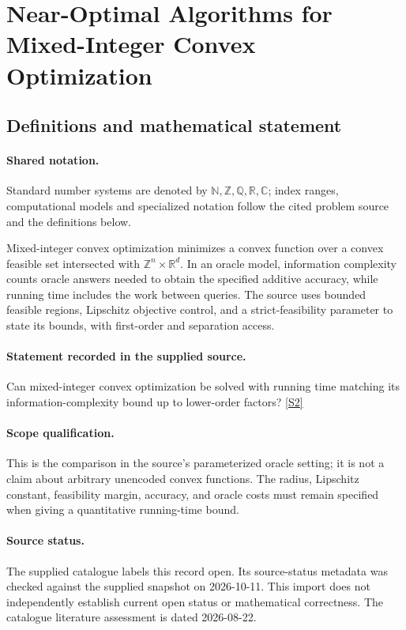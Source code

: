 \documentclass[11pt]{article}
\newcommand{\sref}[2]{\hyperlink{source:#1:#2}{[S#2]}}
\begin{document}
\section{Near-Optimal Algorithms for Mixed-Integer Convex Optimization}\label{statement}

\subsection{Definitions and mathematical statement}

\paragraph{Shared notation.}Standard number systems are denoted by $\mathbb N,\mathbb Z,\mathbb Q,\mathbb R,\mathbb C$; index ranges, computational models and specialized notation follow the cited problem source and the definitions below.


Mixed-integer convex optimization minimizes a convex function over a convex feasible set intersected with $\mathbb Z^n\times\mathbb R^d$. In an oracle model, information complexity counts oracle answers needed to obtain the specified additive accuracy, while running time includes the work between queries. The source uses bounded feasible regions, Lipschitz objective control, and a strict-feasibility parameter to state its bounds, with first-order and separation access.
\paragraph{Statement recorded in the supplied source.}
Can mixed-integer convex optimization be solved with running time matching its information-complexity bound up to lower-order factors? \sref{statement}{2}
\paragraph{Scope qualification.}
This is the comparison in the source's parameterized oracle setting; it is not a claim about arbitrary unencoded convex functions. The radius, Lipschitz constant, feasibility margin, accuracy, and oracle costs must remain specified when giving a quantitative running-time bound.
\paragraph{Source status.}
The supplied catalogue labels this record open. Its source-status metadata was checked against the supplied snapshot on 2026-10-11. This import does not independently establish current open status or mathematical correctness. The catalogue literature assessment is dated 2026-08-22.
\end{document}
